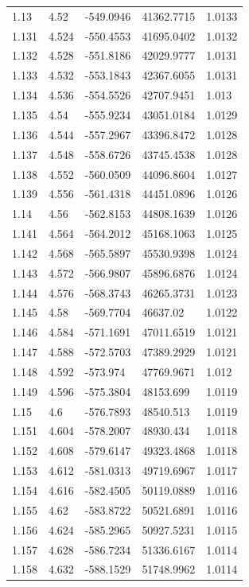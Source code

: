 \begin{tabular}{lllll}
1.13 & 4.52 & -549.0946 & 41362.7715 & 1.0133 \\
1.131 & 4.524 & -550.4553 & 41695.0402 & 1.0132 \\
1.132 & 4.528 & -551.8186 & 42029.9777 & 1.0131 \\
1.133 & 4.532 & -553.1843 & 42367.6055 & 1.0131 \\
1.134 & 4.536 & -554.5526 & 42707.9451 & 1.013 \\
1.135 & 4.54 & -555.9234 & 43051.0184 & 1.0129 \\
1.136 & 4.544 & -557.2967 & 43396.8472 & 1.0128 \\
1.137 & 4.548 & -558.6726 & 43745.4538 & 1.0128 \\
1.138 & 4.552 & -560.0509 & 44096.8604 & 1.0127 \\
1.139 & 4.556 & -561.4318 & 44451.0896 & 1.0126 \\
1.14 & 4.56 & -562.8153 & 44808.1639 & 1.0126 \\
1.141 & 4.564 & -564.2012 & 45168.1063 & 1.0125 \\
1.142 & 4.568 & -565.5897 & 45530.9398 & 1.0124 \\
1.143 & 4.572 & -566.9807 & 45896.6876 & 1.0124 \\
1.144 & 4.576 & -568.3743 & 46265.3731 & 1.0123 \\
1.145 & 4.58 & -569.7704 & 46637.02 & 1.0122 \\
1.146 & 4.584 & -571.1691 & 47011.6519 & 1.0121 \\
1.147 & 4.588 & -572.5703 & 47389.2929 & 1.0121 \\
1.148 & 4.592 & -573.974 & 47769.9671 & 1.012 \\
1.149 & 4.596 & -575.3804 & 48153.699 & 1.0119 \\
1.15 & 4.6 & -576.7893 & 48540.513 & 1.0119 \\
1.151 & 4.604 & -578.2007 & 48930.434 & 1.0118 \\
1.152 & 4.608 & -579.6147 & 49323.4868 & 1.0118 \\
1.153 & 4.612 & -581.0313 & 49719.6967 & 1.0117 \\
1.154 & 4.616 & -582.4505 & 50119.0889 & 1.0116 \\
1.155 & 4.62 & -583.8722 & 50521.6891 & 1.0116 \\
1.156 & 4.624 & -585.2965 & 50927.5231 & 1.0115 \\
1.157 & 4.628 & -586.7234 & 51336.6167 & 1.0114 \\
1.158 & 4.632 & -588.1529 & 51748.9962 & 1.0114 \\

\end{tabular}
